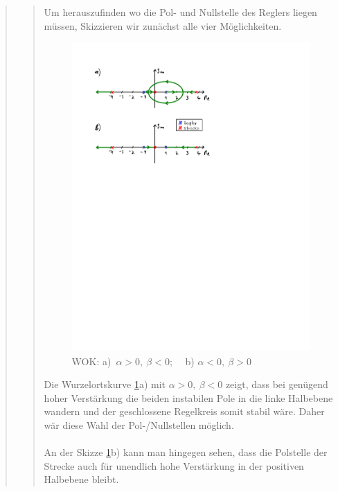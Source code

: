 \begin{quote}
    \begin{quote}
        
        
        Um herauszufinden wo die Pol- und Nullstelle des Reglers liegen müssen, Skizzieren wir zunächst alle vier Möglichkeiten.
        
        
        \begin{figure}[H]
        \centering
            \includegraphics[scale=1, trim = 2cm 16.7cm 9cm 2cm, clip]{Bilder/WOK_GK_phi}
                \caption{WOK: a)\ $\alpha > 0,\ \beta < 0$; \ \ b) $\alpha < 0,\ \beta > 0$}
                \label{fig:WOK_GK_phi}
        \end{figure}
        
        Die Wurzelortskurve \ref{fig:WOK_GK_phi}a) mit $\alpha > 0,\ \beta < 0$ zeigt, dass bei genügend hoher Verstärkung die
        beiden instabilen Pole in die linke Halbebene wandern und der geschlossene Regelkreis somit stabil wäre. Daher wär diese
        Wahl der Pol-/Nullstellen möglich.\\
        \\
        An der Skizze \ref{fig:WOK_GK_phi}b) kann man hingegen sehen, dass die Polstelle der Strecke auch für unendlich hohe
        Verstärkung in der positiven Halbebene bleibt.
        

\end{quote}
\end{quote}
